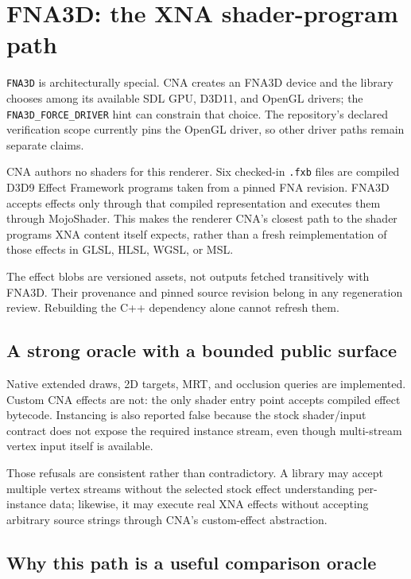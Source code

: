 \section{FNA3D: the XNA shader-program path}

\texttt{FNA3D} is architecturally special.  CNA creates an FNA3D device and the library
chooses among its available SDL GPU, D3D11, and OpenGL drivers; the
\texttt{FNA3D\_FORCE\_DRIVER} hint can constrain that choice.  The repository's declared
verification scope currently pins the OpenGL driver, so other driver paths remain separate
claims.

CNA authors no shaders for this renderer.  Six checked-in \texttt{.fxb} files are compiled
D3D9 Effect Framework programs taken from a pinned FNA revision.  FNA3D accepts effects only
through that compiled representation and executes them through MojoShader.  This makes the
renderer CNA's closest path to the shader programs XNA content itself expects, rather than a
fresh reimplementation of those effects in GLSL, HLSL, WGSL, or MSL.

\begin{sourcenote}
The effect blobs are versioned assets, not outputs fetched transitively with FNA3D.  Their
provenance and pinned source revision belong in any regeneration review.  Rebuilding the C++
dependency alone cannot refresh them.
\end{sourcenote}

\subsection{A strong oracle with a bounded public surface}

Native extended draws, 2D targets, MRT, and occlusion queries are implemented.  Custom CNA
effects are not: the only shader entry point accepts compiled effect bytecode.  Instancing is
also reported false because the stock shader/input contract does not expose the required
instance stream, even though multi-stream vertex input itself is available.

Those refusals are consistent rather than contradictory.  A library may accept multiple
vertex streams without the selected stock effect understanding per-instance data; likewise,
it may execute real XNA effects without accepting arbitrary source strings through CNA's
custom-effect abstraction.

\subsection{Why this path is a useful comparison oracle}

